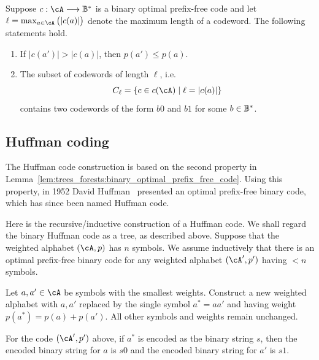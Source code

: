 \begin{lemma}
\label{lem:trees_forests:binary_optimal_prefix_free_code}
Suppose $c: \cA \to \B^*$ is a binary optimal prefix-free code and let
$\ell = \max_{a \in \cA} \big(|c(a)|\big)$ denote the maximum length
of a codeword. The following statements hold.
\begin{enumerate}
\item If $|c(a')| > |c(a)|$, then $p(a') \leq p(a)$.

\item The subset of codewords of length $\ell$, i.e.
\[
C_\ell
=
\{c \in c(\cA) \mid \ell = |c(a)|\}
\]
contains two codewords of the form $b0$ and $b1$ for some $b \in \mathbb{B}^*$.
\end{enumerate}
\end{lemma}



\subsection{Huffman coding}

The Huffman code construction is based on the
second property in
Lemma~\ref{lem:trees_forests:binary_optimal_prefix_free_code}. Using
this property, in 1952 David
Huffman~\cite{Huffman1952} presented an optimal
prefix-free binary code, which has since been named Huffman code.

Here is the recursive/inductive
construction of a Huffman code. We shall regard
the binary Huffman code as a tree, as
described above. Suppose that the weighted
alphabet $(\cA, p)$ has $n$ symbols. We assume inductively that there
is an optimal prefix-free binary code for any weighted alphabet
$(\cA', p')$ having $< n$ symbols.

\begin{description}
\item[Huffman's rule 1] Let $a,a' \in \cA$ be symbols with the
  smallest weights. Construct a new weighted alphabet with $a,a'$
  replaced by the single symbol $a^* = aa'$ and having weight
  $p(a^*) = p(a) + p(a')$. All other symbols and weights remain
  unchanged.

\item[Huffman's rule 2] For the code $(\cA', p')$ above, if $a^*$ is
  encoded as the binary string $s$, then the encoded binary string for
  $a$ is $s0$ and the encoded binary string for $a'$ is $s1$.
\end{description}

